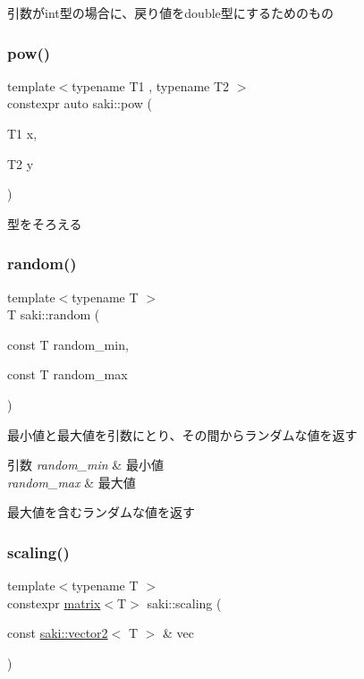 引数がint型の場合に、戻り値をdouble型にするためのもの 

\mbox{\label{namespacesaki_aede1168d9c20adf475c0a27670925c34}} 
\subsubsection{\texorpdfstring{pow()}{pow()}\hspace{0.1cm}{\footnotesize\ttfamily [3/3]}}
{\footnotesize\ttfamily template$<$typename T1 , typename T2 $>$ \\
constexpr auto saki\+::pow (\begin{DoxyParamCaption}\item[{T1}]{x,  }\item[{T2}]{y }\end{DoxyParamCaption})}



型をそろえる 

\mbox{\label{namespacesaki_a636caf16f2f00cb734cc867646ac233f}} 
\subsubsection{\texorpdfstring{random()}{random()}}
{\footnotesize\ttfamily template$<$typename T $>$ \\
T saki\+::random (\begin{DoxyParamCaption}\item[{const T}]{random\+\_\+min,  }\item[{const T}]{random\+\_\+max }\end{DoxyParamCaption})}



最小値と最大値を引数にとり、その間からランダムな値を返す 


\begin{DoxyParams}{引数}
{\em random\+\_\+min} & 最小値 \\
\hline
{\em random\+\_\+max} & 最大値\\
\hline
\end{DoxyParams}
最大値を含むランダムな値を返す \mbox{\label{namespacesaki_abda5ab30bf4dc9240857d62d56e590f9}} 
\subsubsection{\texorpdfstring{scaling()}{scaling()}\hspace{0.1cm}{\footnotesize\ttfamily [1/3]}}
{\footnotesize\ttfamily template$<$typename T $>$ \\
constexpr \mbox{\hyperlink{classsaki_1_1matrix}{matrix}}$<$T$>$ saki\+::scaling (\begin{DoxyParamCaption}\item[{const \mbox{\hyperlink{classsaki_1_1vector2}{saki\+::vector2}}$<$ T $>$ \&}]{vec }\end{DoxyParamCaption})}



